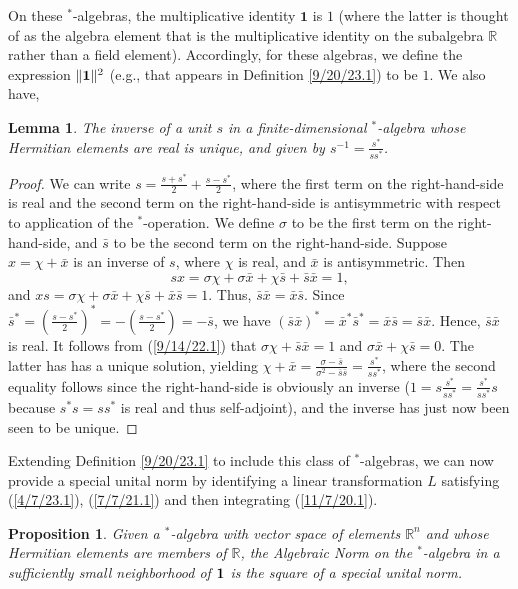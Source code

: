 \documentclass{amsart}
\numberwithin{equation}{section}
\newtheorem{lemma}[theorem]{Lemma}
\newtheorem{proposition}[theorem]{Proposition}
\theoremstyle{definition}
\numberwithin{theorem}{section}
\begin{document}
On these $^*$-algebras, the multiplicative identity $\mathbf{1}$ is $1$ (where the latter is thought of as the algebra element that is the multiplicative identity on the subalgebra $\mathbb{R}$ rather than a field element).  Accordingly, for these algebras, we define the expression $\|{\bf 1}\|^2$ (e.g., that appears in Definition \ref{9/20/23.1}) to be $1$.  We also have,

\begin{lemma}\label{9/14/22.2} The inverse of a unit $s$ in a finite-dimensional $^*$-algebra whose Hermitian elements are real is unique, and given by $s^{-1}=\frac{s^*}{ss^*}$.\end{lemma}

\begin{proof} 
We can write $s=\frac{s+s^*}{2} +\frac{s-s^*}{2}$, where the first  term on the right-hand-side is real and the second term on the right-hand-side is antisymmetric with respect to application of the $^*$-operation.  We define $\sigma$ to be the first term on the right-hand-side, and $\bar{s}$ to be the second term on the right-hand-side.  Suppose $x = \chi + \bar{x}$ is an inverse of $s$, where $\chi$ is real, and $\bar{x}$ is antisymmetric. Then \begin{equation}\label{9/14/22.1} sx = \sigma\chi + \sigma\bar{x}+\chi\bar{s} + \bar{s}\bar{x} = 1,\end{equation} and $xs = \sigma\chi + \sigma\bar{x}+\chi\bar{s} + \bar{x}\bar{s} = 1$.  Thus, $\bar{s}\bar{x} = \bar{x}\bar{s}$.  Since $\bar{s}^* = (\frac{s-s^*}{2})^* = -(\frac{s-s^*}{2}) = -\bar{s}$, we have $(\bar{s}\bar{x})^* = \bar{x}^*\bar{s}^* = \bar{x}\bar{s} = \bar{s}\bar{x}$.  Hence, $\bar{s}\bar{x}$ is real.  It follows from (\ref{9/14/22.1}) that $\sigma\chi+\bar{s}\bar{x} =1$ and $\sigma\bar{x}+\chi\bar{s} = 0$.  The latter has has a unique solution, yielding $\chi+\bar{x} = \frac{\sigma-\bar{s}}{\sigma^2-\bar{s}\bar{s}} = \frac{s^*}{ss^*}$, where the second equality follows since the right-hand-side is obviously an inverse ($1=s\frac{s^*}{ss^*} = \frac{s^*}{ss^*}s$ because $s^*s=ss^*$ is real and thus self-adjoint), and the inverse has just now been seen to be unique.
\end{proof}

Extending Definition \ref{9/20/23.1} to include this class of $^*$-algebras, we can now provide a special unital norm  by identifying a linear transformation $L$ satisfying (\ref{4/7/23.1}), (\ref{7/7/21.1}) and then integrating (\ref{11/7/20.1}).  
 
 \begin{proposition}\label{1/11/22.1} Given a $^*$-algebra with vector space of elements $\mathbb{R}^n$ and whose Hermitian elements are members of $\mathbb{R}$, the Algebraic Norm on the $^*$-algebra in a sufficiently small neighborhood of ${\bf 1}$ is the square of a special unital norm. \end{proposition}
\end{document}
